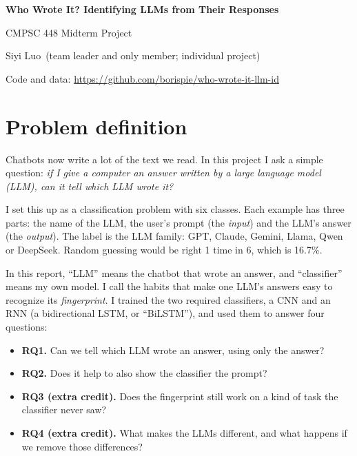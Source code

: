 \documentclass[11pt,letterpaper]{article}
\begin{document}
\begin{center}
{\LARGE\bfseries Who Wrote It? Identifying LLMs from Their Responses\par}
\vspace{6pt}
{\large CMPSC 448 Midterm Project\par}
\vspace{4pt}
{\large Siyi Luo \,(team leader and only member; individual project)\par}
\vspace{4pt}
{\normalsize Code and data: \url{https://github.com/borispie/who-wrote-it-llm-id}\par}
\end{center}

\section{Problem definition}

Chatbots now write a lot of the text we read. In this project I ask a simple question: \emph{if I give a computer
an answer written by a large language model (LLM), can it tell which LLM wrote it?}

I set this up as a classification problem with six classes. Each example has three parts: the name of the LLM,
the user's prompt (the \emph{input}) and the LLM's answer (the \emph{output}). The label is the LLM family: GPT,
Claude, Gemini, Llama, Qwen or DeepSeek. Random guessing would be right 1 time in 6, which is 16.7\%.

In this report, ``LLM'' means the chatbot that wrote an answer, and ``classifier'' means my own model. I call the
habits that make one LLM's answers easy to recognize its \emph{fingerprint}. I trained the two required
classifiers, a CNN and an RNN (a bidirectional LSTM, or ``BiLSTM''), and used them to answer four questions:
\begin{itemize}
  \item \textbf{RQ1.} Can we tell which LLM wrote an answer, using only the answer?
  \item \textbf{RQ2.} Does it help to also show the classifier the prompt?
  \item \textbf{RQ3 (extra credit).} Does the fingerprint still work on a kind of task the classifier never saw?
  \item \textbf{RQ4 (extra credit).} What makes the LLMs different, and what happens if we remove those differences?
\end{itemize}
\end{document}
